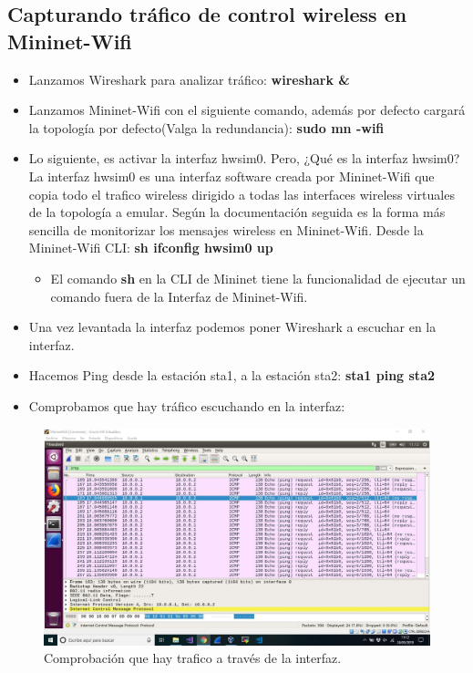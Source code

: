 \subsection{Capturando tráfico de control wireless en Mininet-Wifi}
\begin{itemize}
    \item Lanzamos Wireshark para analizar tráfico: \textbf{wireshark \&}
    \item Lanzamos Mininet-Wifi con el siguiente comando, además por defecto cargará la topología por defecto(Valga la redundancia): \textbf{sudo mn -wifi}
    \item Lo siguiente, es activar la interfaz hwsim0. Pero, ¿Qué es la interfaz hwsim0? La interfaz hwsim0 es una interfaz software creada por Mininet-Wifi que copia todo el trafico wireless  dirigido a todas las interfaces wireless virtuales de la topología a emular. Según la documentación seguida es la forma más sencilla de monitorizar los mensajes wireless en Mininet-Wifi. Desde la Mininet-Wifi CLI: \textbf{sh ifconfig hwsim0 up} 
    \begin{itemize}
        \item El comando \textbf{sh} en la CLI de Mininet tiene la funcionalidad de ejecutar un comando fuera de la Interfaz de Mininet-Wifi.
    \end{itemize}
    
    \item Una vez levantada la interfaz podemos poner Wireshark a escuchar en la interfaz.
    
    \item Hacemos Ping desde la estación sta1, a la estación sta2: \textbf{sta1 ping sta2}
    
    \item Comprobamos que hay tráfico escuchando en la interfaz:
    
    
\end{itemize}
\newpage
\begin{figure}[!htb]
  \centering
    \includegraphics[width=\linewidth]{./img/5.JPG}
    \caption{Comprobación que hay trafico a través de la interfaz.}
  \label{fig:yo}
\end{figure}

